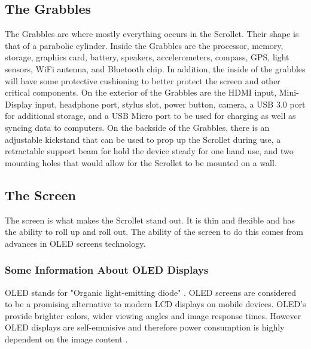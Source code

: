 \documentclass[a4paper]{article}
\begin{document}
\subsection{The Grabbles}
The Grabbles are where mostly everything occurs in the Scrollet. Their shape is that of a parabolic cylinder. Inside the Grabbles are the processor, memory, storage, graphics card, battery, speakers, accelerometers, compass, GPS, light sensors, WiFi antenna, and Bluetooth chip. In addition, the inside of the grabbles will have some protective cushioning to better protect the screen and other critical components. On the exterior of the Grabbles are the HDMI input, Mini-Display input, headphone port, stylus slot, power button, camera, a USB 3.0 port for additional storage, and a USB Micro port to be used for charging as well as syncing data to computers. On the backside of the Grabbles, there is an adjustable kickstand that can be used to prop up the Scrollet during use, a retractable support beam for hold the device steady for one hand use, and two mounting holes that would allow for the Scrollet to be mounted on a wall.

\subsection{The Screen}
The screen is what makes the Scrollet stand out. It is thin and flexible and has the ability to roll up and roll out. The ability of the screen to do this comes from advances in OLED screens technology.

\subsubsection{Some Information About OLED Displays}
OLED stands for "Organic light-emitting diode" \cite{Lin}. OLED screens are considered to be a promising alternative to modern LCD displays on mobile devices.\cite{Lin} OLED's provide brighter colors, wider viewing angles and image response times. However OLED displays are self-emmisive and therefore power consumption is highly dependent on the image content \cite{Lin}.
\end{document}

